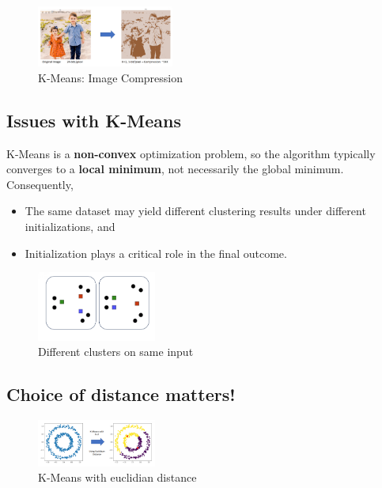 \documentclass[11pt]{article}
\begin{document}
\begin{figure}[h]
	\centering
	\includegraphics[width=0.4\textwidth]{../imgs/img-cluster-ex.png}
	\caption{K-Means: Image Compression}
\end{figure}

\subsection*{Issues with K-Means}
K-Means is a \textbf{non-convex} optimization problem, so the algorithm typically converges to a \textbf{local minimum}, not necessarily the global minimum. Consequently,
\begin{itemize}
    \item The same dataset may yield different clustering results under different initializations, and
    \item Initialization plays a critical role in the final outcome.
\end{itemize}

\begin{figure}[h]
	\centering
	\includegraphics[width=0.35\textwidth]{../imgs/kissue.png}  
	\caption{Different clusters on same input}
\end{figure}

\pagebreak

\subsection*{Choice of distance matters!}

\begin{figure}[h]
	\centering
	\includegraphics[width=0.35\textwidth]{../imgs/kmeans-euc.png}  
	\caption{K-Means with euclidian distance}
\end{figure}
\end{document}
